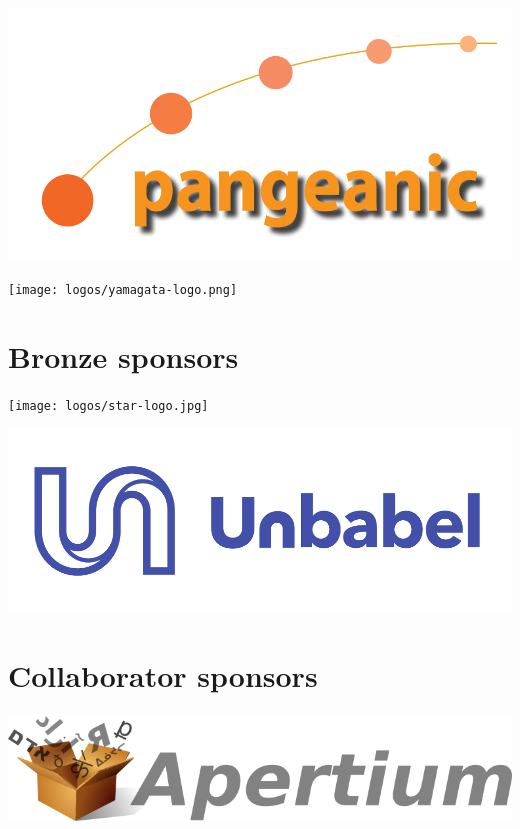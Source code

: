 \documentclass[a4paper,11pt,twoside]{book}
\begin{document}
\vfill

\begin{center}
\includegraphics[width=0.8\columnwidth]{logos/pangeanic-logo.png}

\vfill

\texttt{[image: logos/yamagata-logo.png]}
\end{center}

\vfill

\newpage

\section*{Bronze sponsors}
\vfill

\begin{center}
\texttt{[image: logos/star-logo.jpg]}

\vfill

\includegraphics[width=0.75\columnwidth]{logos/unbabel-logo.png}
\end{center}
\vfill
\newpage

\section*{Collaborator sponsors}
\begin{center}
\includegraphics[width=0.55\columnwidth]{logos/apertium-logo.png}
\end{center}
\end{document}
